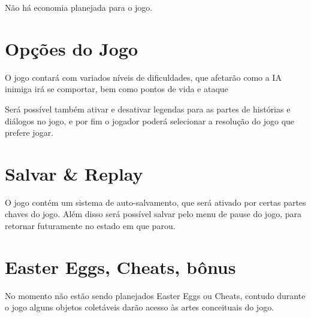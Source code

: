 Não há economia planejada para o jogo.

\section{Opções do Jogo}

O jogo contará com variados níveis de dificuldades, que afetarão como a IA inimiga irá se comportar, bem como pontos de vida e ataque

Será possível também ativar e desativar legendas para as partes de histórias e diálogos no jogo, e por fim o jogador poderá selecionar a resolução do jogo que prefere jogar.

\section{Salvar \& Replay}

O jogo contém um sistema de auto-salvamento, que será ativado por certas partes chaves do jogo. Além disso será possível salvar pelo menu de pause do jogo, para retornar futuramente no estado em que parou.

\section{Easter Eggs, Cheats, bônus}

No momento não estão sendo planejados Easter Eggs ou Cheats, contudo durante o jogo alguns objetos coletáveis darão acesso às artes conceituais do jogo.

